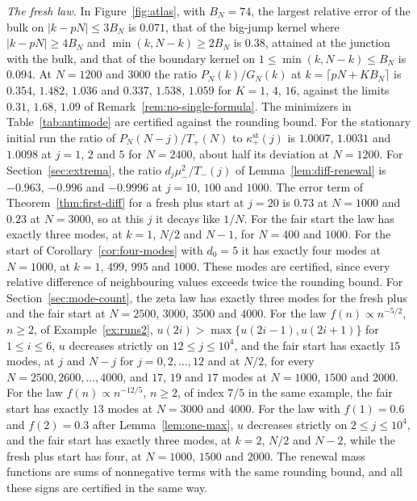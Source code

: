 \emph{The fresh law.} In Figure~\ref{fig:atlas}, with $B_N=74$, the largest relative error
of the bulk on $|k-pN|\le3B_N$ is $0.071$, that of the big-jump kernel where
$|k-pN|\ge4B_N$ and $\min(k,N-k)\ge2B_N$ is $0.38$, attained at the junction with the
bulk, and that of the boundary kernel on $1\le\min(k,N-k)\le B_N$ is $0.094$. At
$N=1200$ and $3000$ the ratio $P_N(k)/G_N(k)$ at $k=\lceil pN+KB_N\rceil$ is $0.354$,
$1.482$, $1.036$ and $0.337$, $1.538$, $1.059$ for $K=1$, $4$, $16$, against the limits
$0.31$, $1.68$, $1.09$ of Remark~\ref{rem:no-single-formula}. The minimizers in
Table~\ref{tab:antimode} are certified against the rounding bound. For the stationary
initial run the ratio of $P_N(N-j)/T_\plus(N)$ to $\kappa^{\mathrm{st}}_\plus(j)$ is
$1.0007$, $1.0031$ and $1.0098$ at $j=1$, $2$ and $5$ for $N=2400$, about half its
deviation at $N=1200$. For Section~\ref{sec:extrema}, the ratio $d_j\mu_\minus^2/T_\minus(j)$
of Lemma~\ref{lem:diff-renewal} is $-0.963$, $-0.996$ and $-0.9996$ at $j=10$, $100$ and
$1000$. The error term of Theorem~\ref{thm:first-diff} for a fresh plus start at $j=20$ is
$0.73$ at $N=1000$ and $0.23$ at $N=3000$, so at this $j$ it decays like $1/N$. For the
fair start the law has exactly three modes, at $k=1$, $N/2$ and $N-1$, for $N=400$ and
$1000$. For the start of Corollary~\ref{cor:four-modes} with $d_0=5$ it has exactly four
modes at $N=1000$, at $k=1$, $499$, $995$ and $1000$. These modes are certified, since every
relative difference of neighbouring values exceeds twice the rounding bound. For
Section~\ref{sec:mode-count}, the zeta law has exactly three modes for the fresh plus and
the fair start at $N=2500$, $3000$, $3500$ and $4000$. For the law $f(n)\propto n^{-5/2}$,
$n\ge2$, of Example~\ref{ex:runs2}, $u(2i)>\max\{u(2i-1),u(2i+1)\}$ for $1\le i\le6$, $u$
decreases strictly on $12\le j\le10^4$, and the fair start has exactly $15$ modes, at $j$
and $N-j$ for $j=0,2,\dots,12$ and at $N/2$, for every $N=2500,2600,\dots,4000$, and $17$,
$19$ and $17$ modes at $N=1000$, $1500$ and $2000$. For the law $f(n)\propto n^{-12/5}$,
$n\ge2$, of index $7/5$ in the same example, the fair start has exactly $13$ modes at
$N=3000$ and $4000$. For the law with $f(1)=0.6$ and $f(2)=0.3$ after
Lemma~\ref{lem:one-max}, $u$ decreases strictly on $2\le j\le10^4$, and the fair start has
exactly three modes, at $k=2$, $N/2$ and $N-2$, while the fresh plus start has four, at
$N=1000$, $1500$ and $2000$. The renewal mass functions are sums of nonnegative terms with
the same rounding bound, and all these signs are certified in the same way.

